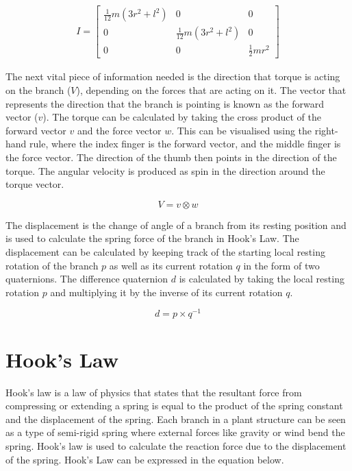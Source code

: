 \begin{equation}
\begin{aligned}
I = \begin{bmatrix}
\frac{1}{12}m(3r^2 + l^2) 	& 0 							& 0 \\
0 							& \frac{1}{12}m(3r^2 + l^2)		& 0 \\
0 							& 0 							& \frac{1}{2}mr^2 
\end{bmatrix}
\end{aligned}
\end{equation}

\noindent
The next vital piece of information needed is the direction that torque is acting on the branch ($V$), depending on the forces that are acting on it. The vector that represents the direction that the branch is pointing is known as the forward vector ($v$). The torque can be calculated by taking the cross product of the forward vector $v$ and the force vector $w$. This can be visualised using the right-hand rule, where the index finger is the forward vector, and the middle finger is the force vector. The direction of the thumb then points in the direction of the torque. The angular velocity is produced as spin in the direction around the torque vector.

\begin{equation}
V = v \otimes w
\end{equation}

\noindent
The displacement is the change of angle of a branch from its resting position and is used to calculate the spring force of the branch in Hook's Law. The displacement can be calculated by keeping track of the starting local resting rotation of the branch $p$ as well as its current rotation $q$ in the form of two quaternions. The difference quaternion $d$ is calculated by taking the local resting rotation $p$ and multiplying it by the inverse of its current rotation $q$. 

\begin{equation}
d = p \times q^{-1}
\end{equation}

\section{Hook's Law}

Hook's law is a law of physics that states that the resultant force from compressing or extending a spring is equal to the product of the spring constant and the displacement of the spring. Each branch in a plant structure can be seen as a type of semi-rigid spring where external forces like gravity or wind bend the spring. Hook's law is used to calculate the reaction force due to the displacement of the spring. Hook's Law can be expressed in the equation below.

